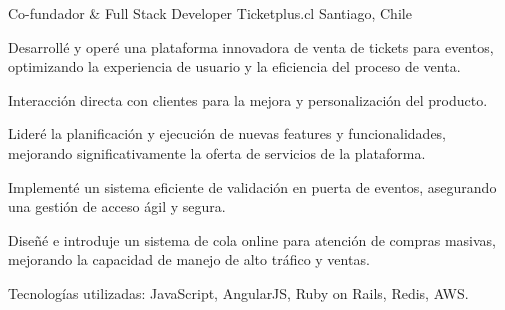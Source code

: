 \begin{cventries}
  \cventry
    {Co-fundador \& Full Stack Developer} %
    {Ticketplus.cl} %
    {Santiago, Chile} %
    {} %
    {
      \begin{cvitems} %
        \item {Desarrollé y operé una plataforma innovadora de venta de tickets para eventos, optimizando la experiencia de usuario y la eficiencia del proceso de venta.}
        \item {Interacción directa con clientes para la mejora y personalización del producto.}
        \item {Lideré la planificación y ejecución de nuevas features y funcionalidades, mejorando significativamente la oferta de servicios de la plataforma.}
        \item {Implementé un sistema eficiente de validación en puerta de eventos, asegurando una gestión de acceso ágil y segura.}
        \item {Diseñé e introduje un sistema de cola online para atención de compras masivas, mejorando la capacidad de manejo de alto tráfico y ventas.}
        \item {Tecnologías utilizadas: JavaScript, AngularJS, Ruby on Rails, Redis, AWS.}
      \end{cvitems}
    }

\end{cventries}
